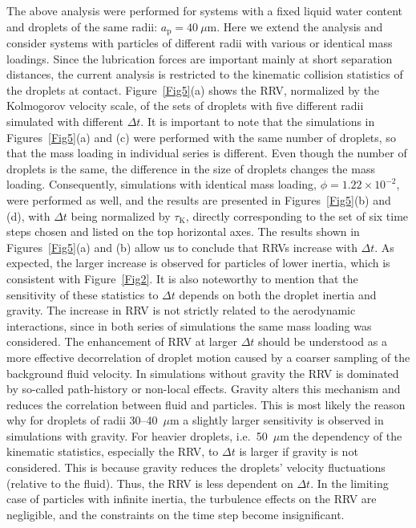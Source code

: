 \documentclass[../thesis.tex]{subfiles}
\begin{document}
The above analysis were performed for systems with a fixed liquid water content and droplets of the same radii: $a_\text{p} = 40~\mu$m. Here we extend the analysis and consider systems with particles of different radii with various or identical mass loadings. Since the lubrication forces are important mainly at short separation distances, the current analysis is restricted to the kinematic collision statistics of the droplets at contact. Figure~\ref{Fig5}(a) shows the RRV, normalized by the Kolmogorov velocity scale, of the sets of droplets with five different radii simulated with different $\Delta t$. It is important to note that the simulations in Figures~\ref{Fig5}(a) and (c) were performed with the same number of droplets, so that the mass loading in individual series is different. Even though the number of droplets is the same, the difference in the size of droplets changes the mass loading. Consequently, simulations with identical mass loading, $\phi = 1.22\times10^{-2}$, were performed as well, and the results are presented in Figures~\ref{Fig5}(b) and (d), with $\Delta t$ being normalized by $\tau_\text{K}$, directly corresponding to the set of six time steps chosen and listed on the top horizontal axes. The results shown in Figures~\ref{Fig5}(a) and (b) allow us to conclude that RRVs increase with $\Delta t$. As expected, the larger increase is observed for particles of lower inertia, which is consistent with Figure~\ref{Fig2}. It is also noteworthy to mention that the sensitivity of these statistics to $\Delta t$ depends on both the droplet inertia and gravity. The increase in RRV is not strictly related to the aerodynamic interactions, since in both series of simulations the same mass loading was considered. The enhancement of RRV at larger $\Delta t$ should be understood as a more effective decorrelation of droplet motion caused by a coarser sampling of the background fluid velocity. In simulations without gravity the RRV is dominated by so-called path-history or non-local effects. Gravity alters this mechanism and reduces the correlation between fluid and particles. This is most likely the reason why for droplets of radii 30--40~$\mu$m a slightly larger sensitivity is observed in simulations with gravity. For heavier droplets, i.e.\ 50~$\mu$m the dependency of the kinematic statistics, especially the RRV, to $\Delta t$ is larger if gravity is not considered. This is because gravity reduces the droplets' velocity fluctuations (relative to the fluid). Thus, the RRV is less dependent on $\Delta t$. In the limiting case of particles with infinite inertia, the turbulence effects on the RRV are negligible, and the constraints on the time step become insignificant.
\end{document}

